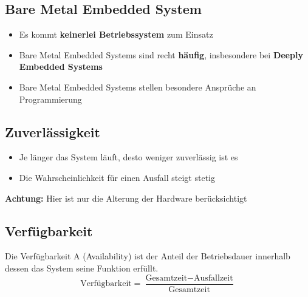 \subsection{Bare Metal Embedded System}

\begin{itemize}
    \item Es kommt \textbf{keinerlei Betriebssystem} zum Einsatz
    \item Bare Metal Embedded Systems sind recht \textbf{häufig}, insbesondere bei \textbf{Deeply Embedded Systems}
    \item Bare Metal Embedded Systems stellen besondere Ansprüche an Programmierung
\end{itemize}


\subsection{Zuverlässigkeit}

\begin{minipage}[c]{0.45\columnwidth}
    
\end{minipage}
\hfill
\begin{minipage}[c]{0.5\columnwidth}
    \raggedright

    \begin{itemize}
        \item Je länger das System läuft, desto weniger zuverlässig ist es
        \item Die Wahrscheinlichkeit für einen Ausfall steigt stetig
    \end{itemize}
    
    \vspace{0.2cm}

    \textbf{Achtung:} Hier ist nur die Alterung der Hardware berücksichtigt
\end{minipage}


\subsection{Verfügbarkeit}

Die Verfügbarkeit A (Availability) ist der Anteil der Betriebsdauer innerhalb dessen das System seine Funktion erfüllt.
$$ \text{Verfügbarkeit} = \frac{\text{Gesamtzeit} - \text{Ausfallzeit}}{\text{Gesamtzeit}} $$



